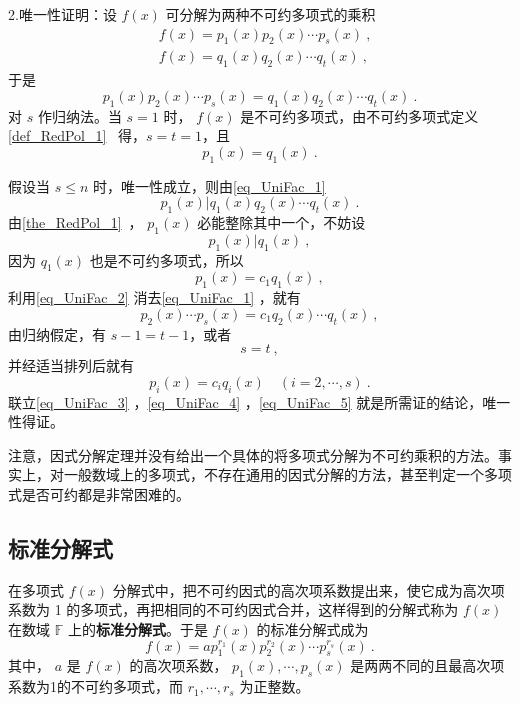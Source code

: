  2.唯一性证明：设 $f(x)$ 可分解为两种不可约多项式的乘积
 \begin{equation}
 \begin{aligned}
 &f(x)=p_1(x)p_2(x)\cdots p_s(x)~,\\
 &f(x)=q_1(x)q_2(x)\cdots q_t(x)~,
 \end{aligned}
 \end{equation}
 于是
 \begin{equation}\label{eq_UniFac_1}
 p_1(x)p_2(x)\cdots p_s(x)=q_1(x)q_2(x)\cdots q_t(x)~.
 \end{equation}
 对 $s$ 作归纳法。当 $s=1$ 时， $f(x)$ 是不可约多项式，由不可约多项式定义\autoref{def_RedPol_1}~ 得，$s=t=1$，且
 \begin{equation}
 p_1(x)=q_1(x)~.
 \end{equation}
 
 假设当 $s\leq n$ 时，唯一性成立，则由\autoref{eq_UniFac_1} 
 \begin{equation}
 p_1(x)|q_1(x)q_2(x)\cdots q_t(x)~.
 \end{equation}
 由\autoref{the_RedPol_1}~， $p_1(x)$ 必能整除其中一个，不妨设
 \begin{equation}
 p_1(x)|q_1(x)~,
 \end{equation}
 因为 $q_1(x)$ 也是不可约多项式，所以
 \begin{equation}\label{eq_UniFac_2}
 p_1(x)=c_1q_1(x)~,
 \end{equation}
 利用\autoref{eq_UniFac_2} 消去\autoref{eq_UniFac_1} ，就有
 \begin{equation}\label{eq_UniFac_3}
 p_2(x)\cdots p_s(x)=c_1q_2(x)\cdots q_t(x)~,
 \end{equation}
 由归纳假定，有 $s-1=t-1$，或者
 \begin{equation}\label{eq_UniFac_4}
 s=t~,
 \end{equation}
 并经适当排列后就有
 \begin{equation}\label{eq_UniFac_5}
 p_i(x)=c_iq_i(x)\quad (i=2,\cdots,s)~.
 \end{equation}
 联立\autoref{eq_UniFac_3} ，\autoref{eq_UniFac_4} ，\autoref{eq_UniFac_5} 就是所需证的结论，唯一性得证。

注意，因式分解定理并没有给出一个具体的将多项式分解为不可约乘积的方法。事实上，对一般数域上的多项式，不存在通用的因式分解的方法，甚至判定一个多项式是否可约都是非常困难的。
\subsection{标准分解式}
在多项式 $f(x)$ 分解式中，把不可约因式的高次项系数提出来，使它成为高次项系数为 1 的多项式，再把相同的不可约因式合并，这样得到的分解式称为 $f(x)$ 在数域 $\mathbb{F}$ 上的\textbf{标准分解式}。于是 $f(x)$ 的标准分解式成为
\begin{equation}
f(x)=ap_1^{r_1}(x)p_2^{r_2}(x)\cdots p_s^{r_s}(x)~.
\end{equation}
其中， $a$ 是 $f(x)$ 的高次项系数， $p_1(x),\cdots,p_s(x)$ 是两两不同的且最高次项系数为1的不可约多项式，而 $r_1,\cdots ,r_s$ 为正整数。

